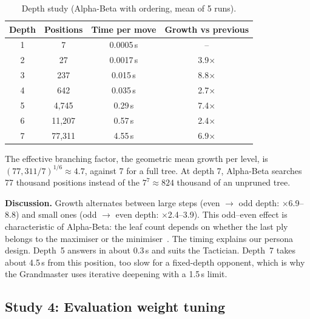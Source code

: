 \documentclass[11pt,a4paper]{article}
\begin{document}
\begin{table}[ht]
\centering\small
\caption{Depth study (Alpha-Beta with ordering, mean of 5 runs).}\label{tab:depth}
\begin{tabular}{@{}cccc@{}}
\toprule
\textbf{Depth} & \textbf{Positions} & \textbf{Time per move} & \textbf{Growth vs previous} \\
\midrule
1 & 7 & 0.0005\,s & -- \\
2 & 27 & 0.0017\,s & 3.9$\times$ \\
3 & 237 & 0.015\,s & 8.8$\times$ \\
4 & 642 & 0.035\,s & 2.7$\times$ \\
5 & 4{,}745 & 0.29\,s & 7.4$\times$ \\
6 & 11{,}207 & 0.57\,s & 2.4$\times$ \\
7 & 77{,}311 & 4.55\,s & 6.9$\times$ \\
\bottomrule
\end{tabular}
\end{table}

\begin{keybox}[title=Finding 3]
The effective branching factor, the geometric mean growth per level, is $(77{,}311/7)^{1/6} \approx \mathbf{4.7}$, against 7 for a full tree. At depth 7, Alpha-Beta searches 77 thousand positions instead of the $7^7 \approx 824$ thousand of an unpruned tree.
\end{keybox}

\textbf{Discussion.} Growth alternates between large steps (even $\to$ odd depth: $\times$6.9--8.8) and small ones (odd $\to$ even depth: $\times$2.4--3.9). This odd--even effect is characteristic of Alpha-Beta: the leaf count depends on whether the last ply belongs to the maximiser or the minimiser~\cite{knuth1975}. The timing explains our persona design. Depth~5 answers in about 0.3\,s and suits the Tactician. Depth~7 takes about 4.5\,s from this position, too slow for a fixed-depth opponent, which is why the Grandmaster uses iterative deepening with a 1.5\,s limit.

\subsection{Study 4: Evaluation weight tuning}
\end{document}
